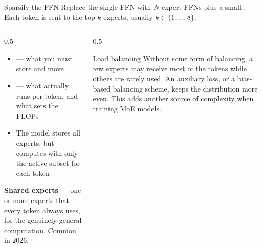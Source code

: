 \documentclass[aspectratio=169,10pt]{beamer}
\begin{document}
\begin{frame}{Sparsify the FFN}
  Replace the single FFN with $N$ expert FFNs plus a small .
  Each token is sent to the top-$k$ experts, usually $k \in \{1,\dots,8\}$.
  \vspace{0.5em}
  \begin{columns}[T]
    \begin{column}{0.5\textwidth}
      \begin{itemize}
        \item {} --- what you must store and move
        \item {} --- what actually runs per token, and what
          sets the FLOPs
        \item The model stores all experts, but computes with only the active
          subset for each token
      \end{itemize}
      \vspace{0.4em}
      \textbf{Shared experts} --- one or more experts that every token always
      uses, for the genuinely general computation. Common in 2026.
    \end{column}
    \begin{column}{0.5\textwidth}
      \begin{block}{Load balancing}
        \small
        Without some form of balancing, a few experts may receive most of the
        tokens while others are rarely used.
        \vspace{0.3em}
        An auxiliary loss, or a bias-based balancing scheme, keeps the
        distribution more even. This adds another source of complexity when
        training MoE models.
      \end{block}
    \end{column}
  \end{columns}
\end{frame}
\end{document}
